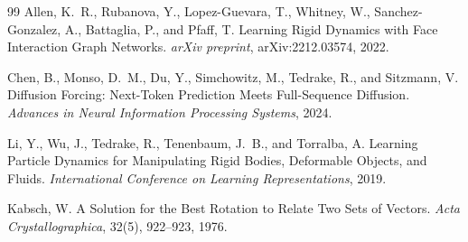 \documentclass[12pt,oneside]{article}
\theoremstyle{definition}
\begin{document}
\begin{thebibliography}{99}
Allen, K.~R., Rubanova, Y., Lopez-Guevara, T., Whitney, W., Sanchez-Gonzalez, A.,
Battaglia, P., and Pfaff, T.
Learning Rigid Dynamics with Face Interaction Graph Networks.
\textit{arXiv preprint},
arXiv:2212.03574, 2022.

Chen, B., Monso, D.~M., Du, Y., Simchowitz, M., Tedrake, R., and Sitzmann, V.
Diffusion Forcing: Next-Token Prediction Meets Full-Sequence Diffusion.
\textit{Advances in Neural Information Processing Systems},
2024.

Li, Y., Wu, J., Tedrake, R., Tenenbaum, J.~B., and Torralba, A.
Learning Particle Dynamics for Manipulating Rigid Bodies, Deformable Objects, and Fluids.
\textit{International Conference on Learning Representations},
2019.

Kabsch, W.
A Solution for the Best Rotation to Relate Two Sets of Vectors.
\textit{Acta Crystallographica},
32(5), 922--923, 1976.

\end{thebibliography}
\end{document}
